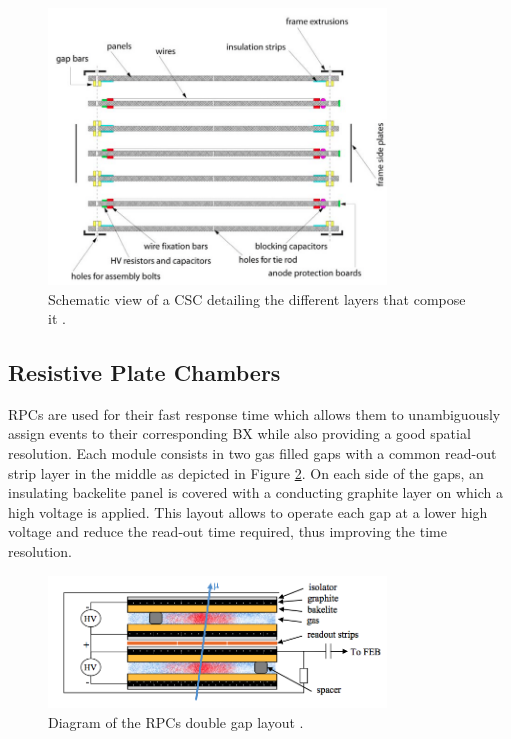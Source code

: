       \begin{figure}[h!]
        \centering
        \includegraphics[width=0.8\textwidth]{img/I-3-cms/csc.png}
        \caption{Schematic view of a CSC detailing the different layers that compose it \cite{1748-0221-3-08-S08004}.}
        \label{fig:I-3-csc}
      \end{figure}

  	\subsection{Resistive Plate Chambers}

      RPCs are used for their fast response time which allows them to unambiguously assign events to their corresponding BX while also providing a good spatial resolution. Each module consists in two gas filled gaps with a common read-out strip layer in the middle as depicted in Figure \ref{fig:I-3-rpc}. On each side of the gaps, an insulating backelite panel is covered with a conducting graphite layer on which a high voltage is applied. This layout allows to operate each gap at a lower high voltage and reduce the read-out time required, thus improving the time resolution. \\

      \begin{figure}[h!]
        \centering
        \includegraphics[width=0.8\textwidth]{img/I-3-cms/rpc.png}
        \caption{Diagram of the RPCs double gap layout \cite{1748-0221-3-08-S08004}.}
        \label{fig:I-3-rpc}
      \end{figure}

